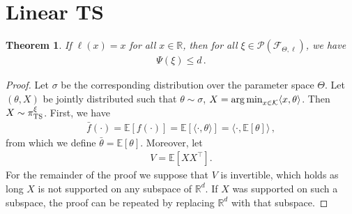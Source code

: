 \documentclass[letter, 12pt]{report}
\newcommand{\R}{\mathbb R}
\newcommand{\argmin}{\operatornamewithlimits{arg\,min}}
\newcommand{\E}{\mathbb E}
\newcommand{\cK}{\mathcal K}
\newcommand{\sF}{\mathscr F}
\newcommand{\sP}{\mathscr P}
\newcommand{\1}{\mathbf{1}}
\newcommand{\ts}{\textsc{TS}\xspace}
\theoremstyle{plain}
\newtheorem{theorem}{Theorem}
\theoremstyle{definition}
\theoremstyle{remark}
\begin{document}
\section{Linear \ts}
\begin{theorem}
    If $\ell(x) = x$ for all $x \in \R$,
    then for all $\xi \in \sP(\sF_{\Theta, \ell})$, we have
    \begin{align*}
        \Psi(\xi) \leq d\,.
    \end{align*}
    \label{thm:ir-ts-linear}
\end{theorem}
\begin{proof}
    Let $\sigma$ be the corresponding distribution over the parameter space $\Theta$.
    Let $(\theta, X)$ be jointly distributed such that $\theta \sim \sigma$, $X = \argmin_{x \in \cK} \langle x, \theta\rangle$.
    Then $X \sim \pi_\ts^\xi$.
    First, we have
    \begin{align*}
        \bar f(\cdot) = \E[f(\cdot)] = \E[\langle \cdot, \theta \rangle] = \langle \cdot, \E[\theta]\rangle\,,
    \end{align*}
    from which we define $\bar{\theta} = \E[\theta]$.
    Moreover, let
    \begin{align*}
        V = \E[X X^\top].
    \end{align*}
    For the remainder of the proof we suppose that $V$ is invertible,
    which holds as long $X$ is not supported on any subspace of $\R^d$.
    If $X$ was supported on such a subspace, the proof can be repeated by replacing $\R^d$ with that subspace.


\end{proof}
\end{document}
